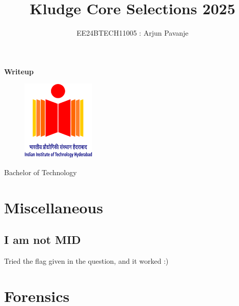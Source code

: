 \documentclass{article}
\title{\textbf{Kludge Core Selections 2025}}
\author{EE24BTECH11005 : Arjun Pavanje}
\begin{document}
\maketitle
\begin{center}
	\textbf{Writeup}
\end{center}
\vspace{30pt}
\begin{figure}[h!]
	\centering
	\includegraphics[width = 100pt]{.logo/logo.png}\\
\end{figure}
\begin{center}
	Bachelor of Technology\\
	\vspace{10pt}
\end{center}
\newpage

\maketitle
\section{Miscellaneous}
\subsection{I am not MID}
Tried the flag given in the question, and it worked :)
\section{Forensics}
\end{document}
